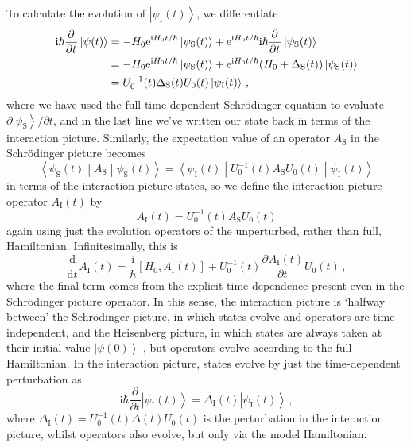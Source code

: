 \documentclass{article}
\theoremstyle{plain}\theoremheaderfont{\normalfont\itshape}\theorembodyfont{\rmfamily}\theoremseparator{.}\newtheorem*{rem}{Remark}\newtheorem*{ex}{Example}\newtheorem*{proof}{Proof}\newtheorem*{altp}{Alternative proof}
\theoremstyle{plain}\theoremheaderfont{\normalfont\bfseries}\theorembodyfont{\rmfamily}\theoremseparator{.}\newtheorem{thm}{Theorem}[section]\newtheorem{lem}[thm]{Lemma}\newtheorem{prop}[thm]{Proposition}\newtheorem*{cor}{Corollary}\newtheorem{defn}[thm]{Definition}\newtheorem{clm}[thm]{Claim}\newtheorem{clminproof}{Claim}
\theoremstyle{break}\theoremheaderfont{\normalfont\itshape}\theorembodyfont{\rmfamily}\theoremseparator{.\medskip}\newtheorem*{proofskip}{Proof}\newtheorem*{exs}{Examples}\newtheorem*{rems}{Remarks}
\theoremstyle{break}\theoremheaderfont{\normalfont\bfseries}\theorembodyfont{\rmfamily}\theoremseparator{.\medskip}\newtheorem{lemskip}[thm]{Lemma}\newtheorem{defnskip}[thm]{Definition}\newtheorem{propskip}[thm]{Proposition}\newtheorem{thmskip}[thm]{Theorem}
\numberwithin{equation}{section}
\newcommand{\ii}{\mathrm{i}}
\newcommand{\ee}{\mathrm{e}}
\newcommand{\dv}[3][]{\frac{\mathrm{d}^{#1} #2}{{\mathrm{d} #3}^{#1}}}
\newcommand{\pdv}[3][]{\frac{\partial^{#1} #2}{{\partial #3}^{#1}}}
\newcommand{\ket}[1]{\left| #1 \right\rangle}
\newcommand{\expval}[2]{\left\langle #2 \middle| #1 \middle| #2 \right\rangle}
\renewcommand{\S}{_{\mathrm{S}}}
\newcommand{\I}{_{\mathrm{I}}}
\begin{document}
    To calculate the evolution of \(\ket{\psi\I(t)}\), we differentiate
    \begin{align}
        \ii\hbar\pdv{}{t}\ket{\psi(t)}&=-H_0 \ee^{\ii H_0 t/\hbar}\ket{\psi\S(t)}+\ee^{\ii H_0t/\hbar}\ii\hbar\pdv{}{t}\ket{\psi\S(t)}\notag\\
        &=-H_0 \ee^{\ii H_0 t/\hbar}\ket{\psi\S(t)}+\ee^{\ii H_0t/\hbar}(H_0+\Delta\S(t))\ket{\psi\S(t)}\notag\\
        &=U_0^{-1}(t)\Delta\S(t) U_0(t)\ket{\psi\I(t)}\,,\label{evolution_of_interaction_picture_state}
    \end{align}
    where we have used the full time dependent Schr\"{o}dinger equation to evaluate \(\partial\ket{\psi\S}/\partial t\), and in the last line we've written our state back in terms of the interaction picture. Similarly, the expectation value of an operator \(A\S\) in the Schr\"{o}dinger picture becomes
    \begin{equation}
        \expval{A\S}{\psi\S(t)}=\expval{U_0^{-1}(t)A\S U_0(t)}{\psi\I(t)}
    \end{equation}
    in terms of the interaction picture states, so we define the interaction picture operator \(A\I(t)\) by
    \begin{equation}
        A\I(t)=U_0^{-1}(t)A\S U_0(t)
    \end{equation}
    again using just the evolution operators of the unperturbed, rather than full, Hamiltonian. Infinitesimally, this is
    \begin{equation}
        \dv{}{t}A\I(t)=\frac{\ii}{\hbar}[H_0,A\I(t)]+U_0^{-1}(t)\pdv{A\I(t)}{t}U_0(t)\,,
    \end{equation}
    where the final term comes from the explicit time dependence present even in the Schr\"{o}dinger picture operator. In this sense, the interaction picture is `halfway between' the Schr\"{o}dinger picture, in which states evolve and operators are time independent, and the Heisenberg picture, in which states are always taken at their initial value \(\ket{\psi(0)}\) , but operators evolve according to the full Hamiltonian. In the interaction picture, states evolve by just the time-dependent perturbation as
    \begin{equation}
        \ii\hbar\pdv{}{t}\ket{\psi\I(t)}=\Delta\I(t)\ket{\psi\I(t)}\,,
    \end{equation}
    where \(\Delta\I(t)=U_0^{-1}(t)\Delta(t)U_0(t)\) is the perturbation in the interaction picture, whilst operators also evolve, but only via the model Hamiltonian.
\end{document}

